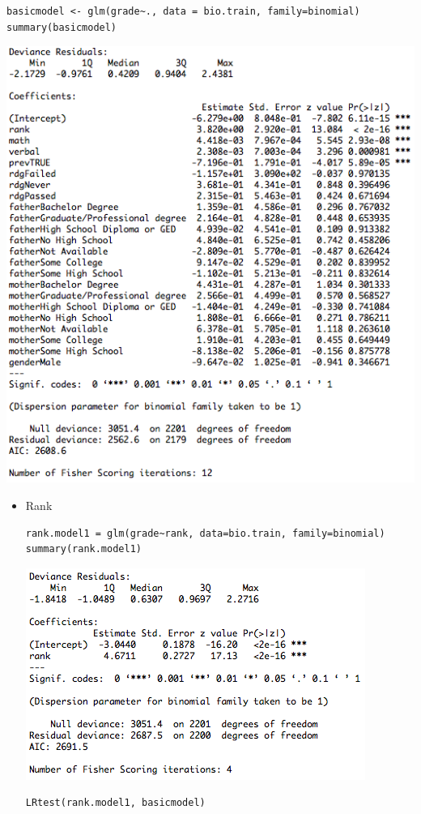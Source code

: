 \documentclass[11pt]{article}
\begin{document}
\begin{enumerate}
\begin{enumerate}
\begin{Verbatim}
basicmodel <- glm(grade~., data = bio.train, family=binomial)
summary(basicmodel)
\end{Verbatim}

		\begin{center}
			\includegraphics[scale=0.7]{basicmodel_summary}
		\end{center}

		\begin{itemize}

			\item Rank
\begin{Verbatim}
rank.model1 = glm(grade~rank, data=bio.train, family=binomial)
summary(rank.model1)
\end{Verbatim}
		\begin{center}
			\includegraphics[scale=0.7]{rank_model1}
		\end{center}
\begin{Verbatim}
LRtest(rank.model1, basicmodel)
\end{Verbatim}


\end{itemize}
\end{enumerate}
\end{enumerate}
\end{document}

